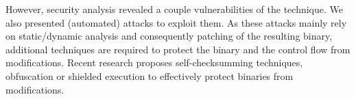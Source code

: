 \documentclass{llncs}
\begin{document}
However, security analysis revealed a couple vulnerabilities of the technique. We also presented (automated) attacks to exploit them. As these attacks mainly rely on static/dynamic analysis and consequently patching of the resulting binary, additional techniques are required to protect the binary and the control flow from modifications. Recent research proposes self-checksumming techniques, obfuscation or shielded execution to effectively protect binaries from modifications.
\end{document}
